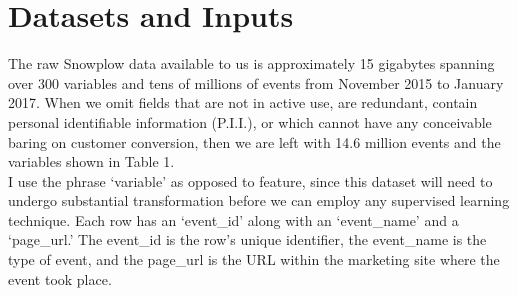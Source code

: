 \documentclass{article} %
\begin{document}
\section{Datasets and Inputs}
\indent\indent The raw Snowplow data available to us is approximately 15 gigabytes spanning over 300 variables and tens of millions of events from November 2015 to January 2017. When we omit fields that are not in active use, are redundant, contain personal identifiable information (P.I.I.), or which cannot have any conceivable baring on customer conversion, then we are left with 14.6 million events and the variables shown in Table 1.\\
\indent I use the phrase `variable' as opposed to feature, since this dataset will need to undergo substantial transformation before we can employ any supervised learning technique. Each row has an `event\_id' along with an `event\_name' and a `page\_url.' The event\_id is the row's unique identifier, the event\_name is the type of event, and the page\_url is the URL within the marketing site where the event took place. \\
\end{document}
